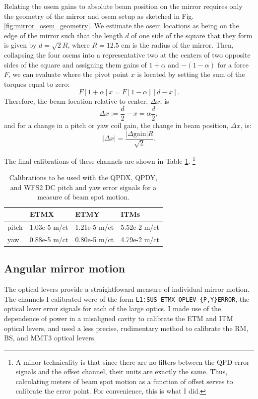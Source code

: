 Relating the osem gains to absolute beam position on the mirror
requires only the geometry of the mirror and osem setup as sketched in
Fig. \ref{fig:mirror_osem_geometry}. We estimate the osem locations as
being on the edge of the mirror such that the length $d$ of one side
of the square that they form is given by $d =\sqrt{2} R$, where $R =
12.5$ cm is the radius of the mirror. Then, collapsing the four osems
into a representative two at the centers of two opposite sides of the
square and assigning them gains of $1 + \alpha$ and $-(1-\alpha)$ for
a force $F$, we can evaluate where the pivot point $x$ is located by
setting the sum of the torques equal to zero:
\begin{equation}
F [1+\alpha] x = F [1-\alpha][d-x].
\end{equation}
Therefore, the beam location relative to center, $\Delta x$, is
\begin{equation}
\Delta x := \frac{d}{2} - x = \alpha \frac{d}{2},
\end{equation}
and for a change in a pitch or yaw coil gain, the change in beam
position, $\Delta x$, is:
\begin{equation}
|\Delta{x}| = \frac{|\Delta{\mbox{gain}}| R}{\sqrt{2}} .
\end{equation}

The final calibrations of these channels are shown in Table
\ref{table:bsmcal}. \footnote{A minor
  technicality is that since there are no filters between the QPD
  error signals and the offset channel, their units are exactly the
  same. Thus, calculating meters of beam spot motion as a function of
  offset serves to calibrate the error point. For convenience, this is
  what I did.}

\begin{table}
\centering
\caption[Beam spot motion calibrations]{Calibrations to be used with
 the QPDX, QPDY, and WFS2 DC pitch and yaw error signals for a
 measure of beam spot motion.} 
\begin{tabular}{l l l l}
\hline
         & ETMX & ETMY & ITMs \\
\hline
pitch & 1.03e-5 m/ct & 1.21e-5 m/ct & 5.52e-2 m/ct \\
yaw & 0.88e-5 m/ct & 0.80e-5 m/ct & 4.79e-2 m/ct \\
\hline
\end{tabular}
\label{table:bsmcal}
\end{table}



\subsection{Angular mirror motion}
The optical levers provide a straightfoward measure of individual
mirror motion. The channels I calibrated were of the form
\texttt{L1:SUS-ETMX\_OPLEV\_\{P,Y\}ERROR}, the optical lever error
signals for each of the large optics. I made use of the dependence of
power in a misaligned cavity to calibrate the ETM and ITM optical
levers, and used a less precise, rudimentary method to calibrate the
RM, BS, and MMT3 optical levers.


